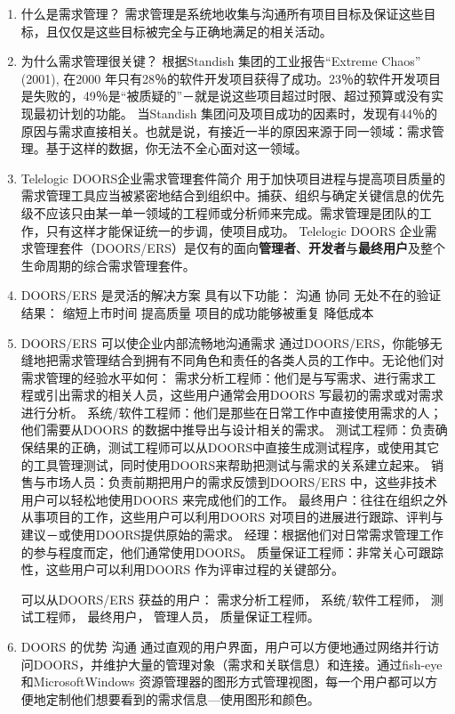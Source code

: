\documentclass[UTF8]{ctexart}
\begin{document}
	\begin{enumerate}
		\item 什么是需求管理？
		需求管理是系统地收集与沟通所有项目目标及保证这些目标，且仅仅是这些目标被完全与正确地满足的相关活动。
		
		\item 为什么需求管理很关键？
		根据Standish 集团的工业报告“Extreme Chaos” (2001), 在2000 年只有28％的软件开发项目获得了成功。23％的软件开发项目是失败的，49％是“被质疑的”－就是说这些项目超过时限、超过预算或没有实现最初计划的功能。
		当Standish 集团问及项目成功的因素时，发现有44％的原因与需求直接相关。也就是说，有接近一半的原因来源于同一领域：需求管理。基于这样的数据，你无法不全心面对这一领域。
		
		\item Telelogic DOORS企业需求管理套件简介
		用于加快项目进程与提高项目质量的需求管理工具应当被紧密地结合到组织中。捕获、组织与确定关键信息的优先级不应该只由某一单一领域的工程师或分析师来完成。需求管理是团队的工作，只有这样才能保证统一的步调，使项目成功。
		Telelogic DOORS 企业需求管理套件（DOORS/ERS）是仅有的面向\textbf{管理者}、\textbf{开发者}与\textbf{最终用户}及整个生命周期的综合需求管理套件。
	
		\item DOORS/ERS 是灵活的解决方案
		具有以下功能：
		沟通
		协同
		无处不在的验证
		结果：
		缩短上市时间
		提高质量
		项目的成功能够被重复
		降低成本
		
		\item DOORS/ERS 可以使企业内部流畅地沟通需求
		通过DOORS/ERS，你能够无缝地把需求管理结合到拥有不同角色和责任的各类人员的工作中。无论他们对需求管理的经验水平如何：
		\subitem 需求分析工程师：他们是与写需求、进行需求工程或引出需求的相关人员，这些用户通常会用DOORS 写最初的需求或对需求进行分析。
		\subitem 系统/软件工程师：他们是那些在日常工作中直接使用需求的人；他们需要从DOORS 的数据中推导出与设计相关的需求。
		\subitem 测试工程师：负责确保结果的正确，测试工程师可以从DOORS中直接生成测试程序，或使用其它的工具管理测试，同时使用DOORS来帮助把测试与需求的关系建立起来。
		\subitem 销售与市场人员：负责前期把用户的需求反馈到DOORS/ERS 中，这些非技术用户可以轻松地使用DOORS 来完成他们的工作。
		\subitem 最终用户：往往在组织之外从事项目的工作，这些用户可以利用DOORS 对项目的进展进行跟踪、评判与建议－或使用DOORS提供原始的需求。
		\subitem 经理：根据他们对日常需求管理工作的参与程度而定，他们通常使用DOORS。
		\subitem 质量保证工程师：非常关心可跟踪性，这些用户可以利用DOORS 作为评审过程的关键部分。
		
		可以从DOORS/ERS 获益的用户：
		需求分析工程师，
		系统/软件工程师，
		测试工程师，
		最终用户，
		管理人员，	
		质量保证工程师。
	
		\item DOORS 的优势
		沟通
		通过直观的用户界面，用户可以方便地通过网络并行访问DOORS，并维护大量的管理对象（需求和关联信息）和连接。通过fish-eye 和MicrosoftWindows 资源管理器的图形方式管理视图，每一个用户都可以方便地定制他们想要看到的需求信息—使用图形和颜色。
	\end{enumerate}
	
\end{document}

